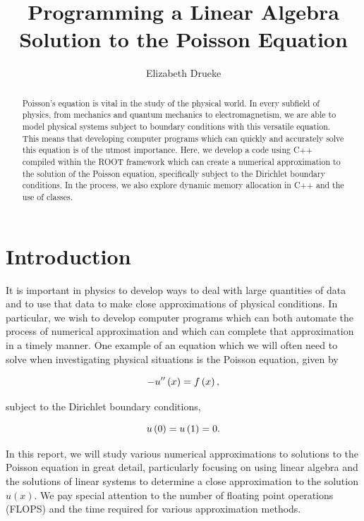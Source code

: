 \documentclass[12pt]{article}
\title{Programming a Linear Algebra Solution to the Poisson Equation}
\author{Elizabeth Drueke}
\numberwithin{equation}{section}
\begin{document}
\maketitle

\begin{abstract}
Poisson's equation is vital in the study of the physical world.  In every subfield of physics, from mechanics and quantum mechanics to electromagnetism, we are able to model physical systems subject to boundary conditions with this versatile equation.  This means that developing computer programs which can quickly and accurately solve this equation is of the utmost importance.  Here, we develop a code using C++ compiled within the ROOT framework which can create a numerical approximation to the solution of the Poisson equation, specifically subject to the Dirichlet boundary conditions.  In the process, we also explore dynamic memory allocation in C++ and the use of classes.
\end{abstract}

\section{Introduction}
\label{sec:into}
It is important in physics to develop ways to deal with large quantities of data and to use that data to make close approximations of physical conditions.  In particular, we wish to develop computer programs which can both automate the process of numerical approximation and which can complete that approximation in a timely manner.  One example of an equation which we will often need to solve when investigating physical situations is the Poisson equation, given by 

\begin{equation}
\vspace{.2cm}
\label{eq:poisson}
-u''\left(x\right) = f\left(x\right),
\end{equation}

\noindent subject to the Dirichlet boundary conditions,

\begin{equation}
\vspace{.2cm}
\label{eq:dirichlet}
u\left(0\right)=u\left(1\right)=0.
\end{equation}

In this report, we will study various numerical approximations to solutions to the Poisson equation in great detail, particularly focusing on using linear algebra and the solutions of linear systems to determine a close approximation to the solution $u\left(x\right)$.  We pay special attention to the number of floating point operations (FLOPS) and the time required for various approximation methods.
\end{document}
